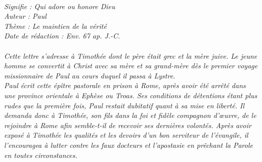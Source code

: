 \BFont
\noindent\hrulefill
{\footnotesize
\textit{
\bigskip
{\centering{}
\\Signifie : Qui adore ou honore Dieu
\\Auteur : Paul
\\Thème : Le maintien de la vérité
\\Date de rédaction : Env. 67 ap. J.-C.\\}
}
\textit{
\\Cette lettre s’adresse à Timothée dont le père était grec et la mère juive. Le jeune homme se convertit à Christ avec sa mère et sa grand-mère dès le premier voyage missionnaire de Paul au cours duquel il passa à Lystre.
\\Paul écrit cette épître pastorale en prison à Rome, après avoir été arrêté dans une province orientale à Ephèse ou Troas.  Ses conditions de détentions étant plus rudes que la première fois, Paul restait dubitatif quant à sa mise en liberté. Il demanda donc à Timothée, son fils dans la foi et fidèle compagnon d’œuvre, de le rejoindre à Rome afin semble-t-il de recevoir ses dernières volontés. Après avoir exposé à Timothée les qualités et les devoirs d’un bon serviteur de l’évangile, il l’encouragea à lutter contre les faux docteurs et l’apostasie en prêchant la Parole en toutes circonstances.\bigskip
}
}
\par\nobreak\noindent\hrulefill
